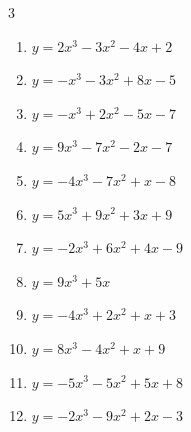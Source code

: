 \begin{multicols}{3}
\begin{enumerate}
  \item $y=2x^{3}-3x^{2}-4x+2$


  \item $y=-x^{3}-3x^{2}+8x-5$


  \item $y=-x^{3}+2x^{2}-5x-7$


  \item $y=9x^{3}-7x^{2}-2x-7$


  \item $y=-4x^{3}-7x^{2}+x-8$


  \item $y=5x^{3}+9x^{2}+3x+9$


  \item $y=-2x^{3}+6x^{2}+4x-9$


  \item $y=9x^{3}+5x$


\columnbreak %

\resetques

  \item $y=-4x^{3}+2x^{2}+x+3$


  \item $y=8x^{3}-4x^{2}+x+9$


  \item $y=-5x^{3}-5x^{2}+5x+8$


  \item $y=-2x^{3}-9x^{2}+2x-3$



\end{enumerate}
\end{multicols}
